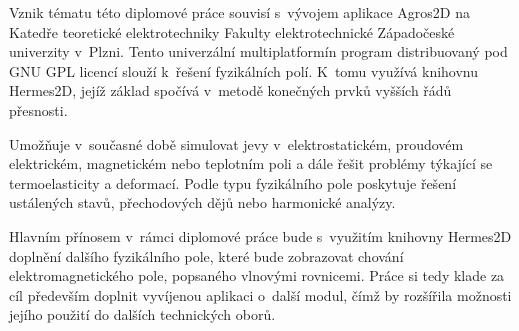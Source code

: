 Vznik tématu této diplomové práce souvisí s~vývojem aplikace Agros2D na Katedře teoretické elektrotechniky Fakulty elektrotechnické Západočeské univerzity v~Plzni. Tento univerzální multiplatformín program distribuovaný pod GNU GPL licencí slouží k~řešení fyzikálních polí. K~tomu využívá knihovnu Hermes2D, jejíž základ spočívá v~metodě konečných prvků vyšších řádů přesnosti.  

Umožňuje v~současné době simulovat jevy v~elektrostatickém, proudovém elektrickém, magnetickém nebo teplotním poli a dále řešit problémy týkající se termoelasticity a deformací. Podle typu fyzikálního pole poskytuje řešení ustálených stavů, přechodových dějů nebo harmonické analýzy.  

Hlavním přínosem v~rámci diplomové práce bude s~využitím knihovny Hermes2D doplnění dalšího fyzikálního pole, které bude zobrazovat chování elektromagnetického pole, popsaného vlnovými rovnicemi. Práce si tedy klade za cíl především doplnit vyvíjenou aplikaci o~další modul, čímž by rozšířila možnosti jejího použití do dalších technických oborů. 
